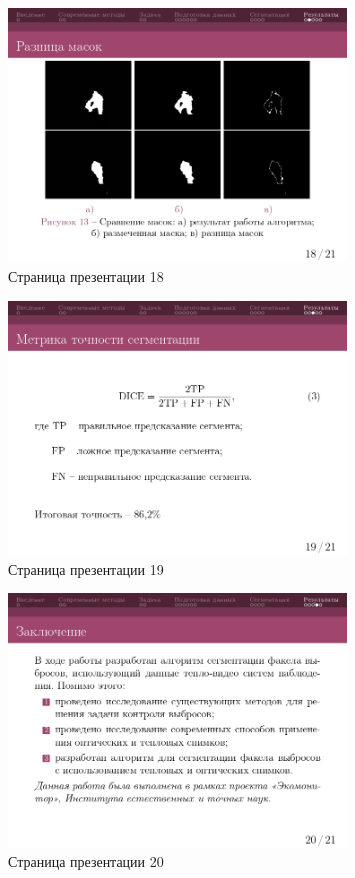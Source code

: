\documentclass[14pt, a4paper]{extreport}
\begin{document}
	\begin{figure}[h!]
		\centering
		\includegraphics[width = 0.8\textwidth]{image/процентовка1_page-0018}	
		\caption{Страница презентации 18}
	\end{figure}
	\begin{figure}[h!]
		\centering
		\includegraphics[width = 0.8\textwidth]{image/процентовка1_page-0019}	
		\caption{Страница презентации 19}
	\end{figure}
	\begin{figure}[h!]
		\centering
		\includegraphics[width = 0.8\textwidth]{image/процентовка1_page-0020}	
		\caption{Страница презентации 20}
	\end{figure}
\end{document}
